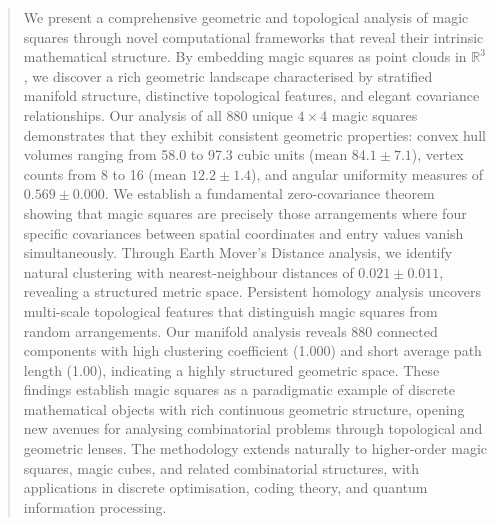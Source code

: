 \begin{abstract}
We present a comprehensive geometric and topological analysis of magic squares through novel computational frameworks that reveal their intrinsic mathematical structure. By embedding magic squares as point clouds in $\mathbb{R}^3$, we discover a rich geometric landscape characterised by stratified manifold structure, distinctive topological features, and elegant covariance relationships. Our analysis of all 880 unique $4 \times 4$ magic squares demonstrates that they exhibit consistent geometric properties: convex hull volumes ranging from 58.0 to 97.3 cubic units (mean $84.1 \pm 7.1$), vertex counts from 8 to 16 (mean $12.2 \pm 1.4$), and angular uniformity measures of $0.569 \pm 0.000$. We establish a fundamental zero-covariance theorem showing that magic squares are precisely those arrangements where four specific covariances between spatial coordinates and entry values vanish simultaneously. Through Earth Mover's Distance analysis, we identify natural clustering with nearest-neighbour distances of $0.021 \pm 0.011$, revealing a structured metric space. Persistent homology analysis uncovers multi-scale topological features that distinguish magic squares from random arrangements. Our manifold analysis reveals 880 connected components with high clustering coefficient (1.000) and short average path length (1.00), indicating a highly structured geometric space. These findings establish magic squares as a paradigmatic example of discrete mathematical objects with rich continuous geometric structure, opening new avenues for analysing combinatorial problems through topological and geometric lenses. The methodology extends naturally to higher-order magic squares, magic cubes, and related combinatorial structures, with applications in discrete optimisation, coding theory, and quantum information processing.
\end{abstract} 
